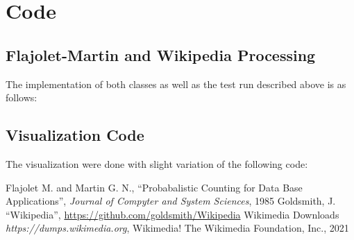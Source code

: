 \documentclass[11pt]{article}
\begin{document}
\section{Code}
\label{sec:class}



\lstset{style=mystyle}



\subsection{Flajolet-Martin and Wikipedia Processing }
The implementation of both classes as well as the test run described above is as follows:



\subsection{Visualization Code}
The visualization were done with slight variation of the following code:


\pagebreak
\clearpage\null\newpage
\begin{thebibliography}{widest entry}
 Flajolet M. and Martin G. N., ``Probabalistic Counting for Data Base Applications'', \emph{Journal of Compyter and System Sciences}, 1985
 Goldsmith, J. ``Wikipedia'', \url{https://github.com/goldsmith/Wikipedia}
 Wikimedia Downloads \emph{https://dumps.wikimedia.org}, Wikimedia! The Wikimedia Foundation, Inc., 2021
\end{thebibliography}
\end{document}
